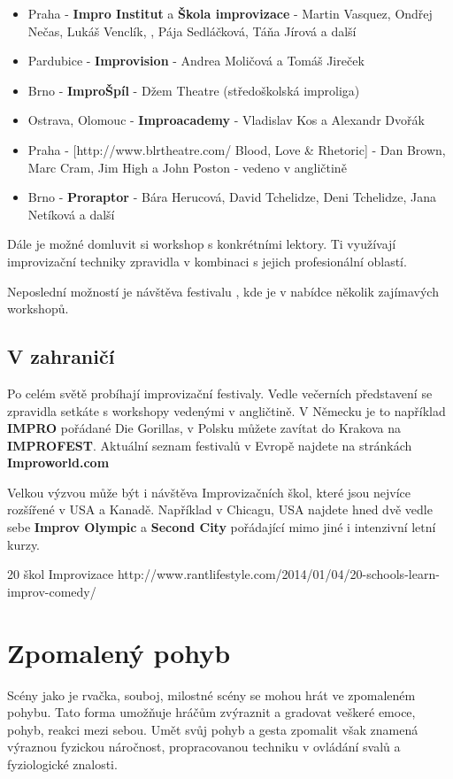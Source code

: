 \begin{itemize}
\item  Praha - \textbf{Impro Institut} a \textbf{Škola improvizace} - Martin Vasquez, Ondřej Nečas, Lukáš Venclík,   , Pája Sedláčková, Táňa Jírová a další
\item  Pardubice - \textbf{Improvision} - Andrea Moličová a Tomáš Jireček
\item  Brno - \textbf{ImproŠpíl} - Džem Theatre (středoškolská improliga)
\item  Ostrava, Olomouc - \textbf{Improacademy} - Vladislav Kos a Alexandr Dvořák
\item  Praha - [http://www.blrtheatre.com/ Blood, Love & Rhetoric] - Dan Brown, Marc Cram, Jim High a John Poston -  vedeno v angličtině
\item  Brno - \textbf{Proraptor} - Bára Herucová, David Tchelidze, Deni Tchelidze, Jana Netíková a další
\end{itemize}
 
Dále je možné domluvit si workshop s konkrétními lektory. Ti využívají improvizační techniky zpravidla v kombinaci s jejich profesionální oblastí.  
 
 
Neposlední možností je návštěva festivalu , kde je v nabídce několik zajímavých workshopů.  
  
\subsection{ V zahraničí }  
Po celém světě probíhají improvizační festivaly. Vedle večerních představení se zpravidla setkáte s workshopy vedenými v angličtině. V Německu je to například \textbf{IMPRO} pořádané Die Gorillas, v Polsku můžete zavítat do Krakova na \textbf{IMPROFEST}. Aktuální seznam festivalů v Evropě najdete na stránkách \textbf{Improworld.com} 
 
 
Velkou výzvou může být i návštěva Improvizačních škol, které jsou nejvíce rozšířené v USA a Kanadě. Například v Chicagu, USA najdete hned dvě vedle sebe \textbf{Improv Olympic} a \textbf{Second City} pořádající mimo jiné i intenzivní letní kurzy. 
 
 
20 škol Improvizace  http://www.rantlifestyle.com/2014/01/04/20-schools-learn-improv-comedy/ 
\needspace{5cm} \section{Zpomalený pohyb} \label{zpomalený pohyb} Scény jako je rvačka, souboj, milostné scény se mohou hrát ve zpomaleném pohybu. Tato forma umožňuje hráčům zvýraznit a gradovat veškeré emoce, pohyb, reakci mezi sebou. 
Umět svůj pohyb a gesta zpomalit však znamená výraznou fyzickou náročnost, propracovanou techniku v ovládání svalů a fyziologické znalosti. 
 

